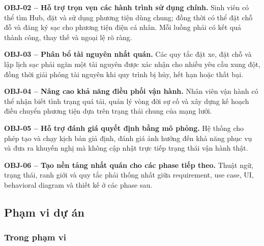 \medskip
\noindent\textbf{OBJ-02 -- Hỗ trợ trọn vẹn các hành trình sử dụng chính.}
Sinh viên có thể tìm Hub, đặt và sử dụng phương tiện dùng chung; đồng thời có thể đặt chỗ đỗ và đăng ký sạc cho phương tiện điện cá nhân. Mỗi luồng phải có kết quả thành công, thay thế và ngoại lệ rõ ràng.

\medskip
\noindent\textbf{OBJ-03 -- Phân bổ tài nguyên nhất quán.}
Các quy tắc đặt xe, đặt chỗ và lập lịch sạc phải ngăn một tài nguyên được xác nhận cho nhiều yêu cầu xung đột, đồng thời giải phóng tài nguyên khi quy trình bị hủy, hết hạn hoặc thất bại.

\medskip
\noindent\textbf{OBJ-04 -- Nâng cao khả năng điều phối vận hành.}
Nhân viên vận hành có thể nhận biết tình trạng quá tải, quản lý vòng đời sự cố và xây dựng kế hoạch điều chuyển phương tiện dựa trên trạng thái chung của mạng lưới.

\medskip
\noindent\textbf{OBJ-05 -- Hỗ trợ đánh giá quyết định bằng mô phỏng.}
Hệ thống cho phép tạo và chạy kịch bản giả định, đánh giá ảnh hưởng đến khả năng phục vụ và đưa ra khuyến nghị mà không cập nhật trực tiếp trạng thái vận hành thật.

\medskip
\noindent\textbf{OBJ-06 -- Tạo nền tảng nhất quán cho các phase tiếp theo.}
Thuật ngữ, trạng thái, ranh giới và quy tắc phải thống nhất giữa requirement, use case, UI, behavioral diagram và thiết kế ở các phase sau.

\subsection{Phạm vi dự án}

\subsubsection*{Trong phạm vi}

